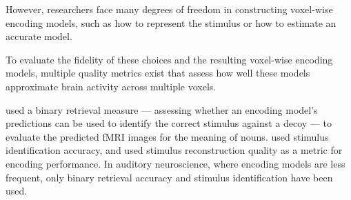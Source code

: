 





However, researchers face many degrees of freedom in constructing voxel-wise encoding models, 
such as how to represent the stimulus or how to estimate an accurate model.

To evaluate the fidelity of these choices and the resulting voxel-wise encoding models,
multiple quality metrics exist that assess how well these models approximate brain activity across multiple voxels.




\citet{ML08} used a binary retrieval measure --- assessing
whether an encoding model's predictions can be used to identify the correct
stimulus against a decoy --- to evaluate the predicted f{MRI} images for the meaning
of nouns. \citet{KG+08} used stimulus identification accuracy, and \citet{NG09} used
stimulus reconstruction quality as a metric for encoding performance.
In auditory neuroscience, where encoding models are less frequent, only binary retrieval
accuracy \citep{CTK+2012} and stimulus identification \citep{SF14} have been
used. 


